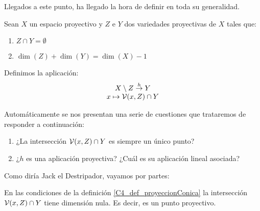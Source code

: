 Llegados a este punto, ha llegado la hora de definir  en toda su generalidad.
\begin{defi}
	\label{C4_def_proyeccionConica}
	Sean $X$ un espacio proyectivo y $Z$ e $Y$ dos variedades proyectivas de $X$ tales que:
	\begin{enumerate}
		\item $Z\cap Y=\emptyset$
		\item $\dim(Z)+\dim(Y)=\dim(X)-1$
	\end{enumerate}
	Definimos la aplicación:
	\[\begin{array}{c}
	X\setminus Z\stackrel{h}{\to} Y\\
	x\mapsto\mathcal{V}(x,Z)\cap Y
	\end{array}\]
\end{defi}
Automáticamente se nos presentan una serie de cuestiones que trataremos de responder a continuación:
\begin{enumerate}
	\item ¿La intersección $\mathcal{V}(x,Z)\cap Y$ es siempre un único punto?
	\item ¿$h$ es una aplicación proyectiva? ¿Cuál es su aplicación lineal asociada?
\end{enumerate}
Como diría Jack el Destripador, vayamos por partes:
\begin{prop}
	\label{C4_prop_interseccionUnipuntual}
	En las condiciones de la definición \ref{C4_def_proyeccionConica} la intersección $\mathcal{V}(x,Z)\cap Y$ tiene dimensión nula. Es decir, es un punto proyectivo.
\end{prop}
